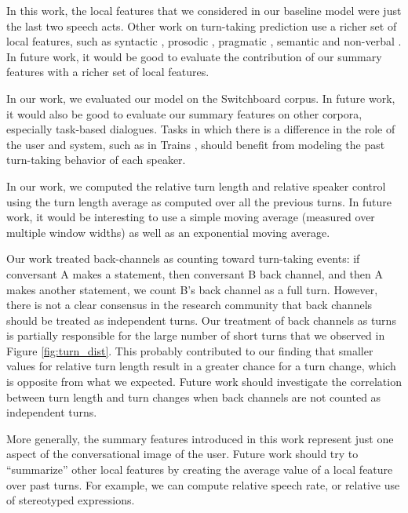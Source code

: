 In this work, the local features that we considered in our baseline model were just the last two speech acts.  Other work on turn-taking prediction use a richer set of local features, such as
%
syntactic \cite{ duncan1972some, sacks1974simplest, ford1996interactional, de2006projecting, magyari2012prediction, atterer2008towards}, prosodic \cite{ duncan1972some, ford1996interactional, shriberg2000prosody, ferrer2003prosody, de2006projecting, reed2009units, raux2012optimizing, hariharan2001robust, atterer2008towards}, pragmatic \cite{ ford1996interactional, garrod2015use, raux2012optimizing}, semantic \cite{raux2012optimizing} and non-verbal \cite{kendon1967some}. In future work, it would be good to evaluate the contribution of our summary features with a richer set of local features.

In our work, we evaluated our model on the Switchboard corpus.  In future work, it would also be good to evaluate our summary features on other corpora, especially task-based dialogues.  Tasks in which there is a difference in the role of the user and system, such as in Trains \cite{HeemanAllen95:cdrom}, should benefit from modeling the past turn-taking behavior of each speaker.

In our work, we computed the relative turn length and relative speaker control using the turn length average as computed over all the previous turns. In future work, it would be interesting to use a simple moving average (measured over multiple window widths) as well as an exponential moving average.



Our work treated back-channels as counting toward turn-taking events:  if conversant A makes a statement, then conversant B back channel, and then A makes another statement, we count B's back channel as a full turn.  However, there is not a clear consensus in the research community that back channels should be treated as independent turns.  Our treatment of back channels as turns is partially responsible for the large number of short turns that we observed in Figure \ref {fig:turn_dist}.  This probably contributed to our finding that smaller values for relative turn length result in a greater chance for a turn change, which is opposite from what we expected. Future work should investigate the correlation between turn length and turn changes when back channels are not counted as independent turns.

More generally, the summary features introduced in this work represent just one aspect of the conversational image of the user. Future work should try to ``summarize'' other local features by creating
the average value of a local feature over past turns. For example, we can compute relative speech rate, or relative use of stereotyped expressions.
